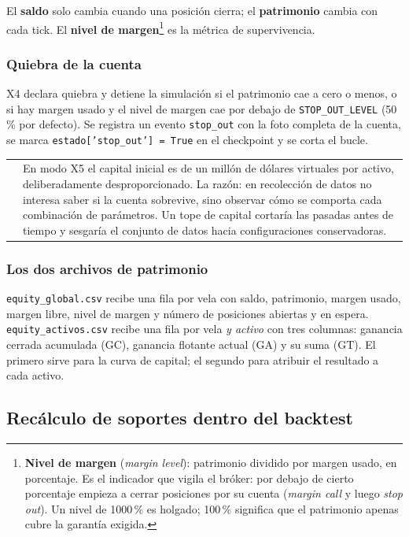 \documentclass[11pt,a4paper]{article}
\makeatletter
\newcommand{\code}[1]{\texttt{\small #1}}
\newenvironment{nota}{%
  \par\medskip\noindent
  \begin{tabular}{@{}p{0.4em}@{\hspace{8pt}}p{\dimexpr\linewidth-2em\relax}@{}}
  \textcolor{cnaranja}{\rule{3pt}{1.1em}} &
}{\end{tabular}\par\medskip}
\newcommand{\bigsep}{\par\vspace{3pt}}
\makeatother
\begin{document}
\bigsep
El \textbf{saldo} solo cambia cuando una posición cierra; el \textbf{patrimonio} cambia con
cada tick. El \textbf{nivel de margen}\footnote{\textbf{Nivel de margen} (\textit{margin
level}): patrimonio dividido por margen usado, en porcentaje. Es el indicador que vigila el
bróker: por debajo de cierto porcentaje empieza a cerrar posiciones por su cuenta
(\textit{margin call} y luego \textit{stop out}). Un nivel de 1000\,\% es holgado; 100\,\%
significa que el patrimonio apenas cubre la garantía exigida.} es la métrica de
supervivencia.

\subsubsection{Quiebra de la cuenta}

X4 declara quiebra y detiene la simulación si el patrimonio cae a cero o menos, o si hay
margen usado y el nivel de margen cae por debajo de \code{STOP_OUT_LEVEL} (50\,\% por
defecto). Se registra un evento \code{stop_out} con la foto completa de la cuenta, se marca
\code{estado['stop_out'] = True} en el checkpoint y se corta el bucle.

\begin{nota}
En modo X5 el capital inicial es de un millón de dólares virtuales por activo,
deliberadamente desproporcionado. La razón: en recolección de datos no interesa saber si la
cuenta sobrevive, sino observar cómo se comporta cada combinación de parámetros. Un tope de
capital cortaría las pasadas antes de tiempo y sesgaría el conjunto de datos hacia
configuraciones conservadoras.
\end{nota}

\subsubsection{Los dos archivos de patrimonio}

\code{equity_global.csv} recibe una fila por vela con saldo, patrimonio, margen usado,
margen libre, nivel de margen y número de posiciones abiertas y en espera.
\code{equity_activos.csv} recibe una fila por vela \textit{y activo} con tres columnas:
ganancia cerrada acumulada (GC), ganancia flotante actual (GA) y su suma (GT). El primero
sirve para la curva de capital; el segundo para atribuir el resultado a cada activo.

\subsection{Recálculo de soportes dentro del backtest}
\end{document}
